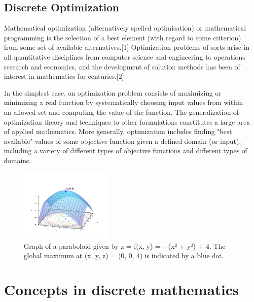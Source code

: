 \documentclass{article}
\begin{document}
\subsection{Discrete Optimization}
Mathematical optimization (alternatively spelled optimisation) or mathematical programming is the selection of a best element (with regard to some criterion) from some set of available alternatives.[1] Optimization problems of sorts arise in all quantitative disciplines from computer science and engineering to operations research and economics, and the development of solution methods has been of interest in mathematics for centuries.[2]

In the simplest case, an optimization problem consists of maximizing or minimizing a real function by systematically choosing input values from within an allowed set and computing the value of the function. The generalization of optimization theory and techniques to other formulations constitutes a large area of applied mathematics. More generally, optimization includes finding "best available" values of some objective function given a defined domain (or input), including a variety of different types of objective functions and different types of domains.
\begin{figure}[h]
\includegraphics[width=0.4\textwidth]{sm.png}
\caption{Graph of a paraboloid given by z = f(x, y) = −(x² + y²) + 4. The global maximum at (x, y, z) = (0, 0, 4) is indicated by a blue dot.}
\end{figure}  
\section{Concepts in discrete mathematics}
\end{document}
